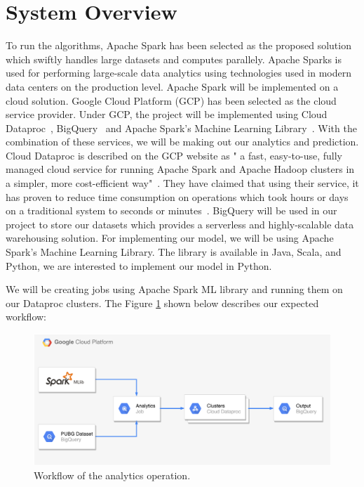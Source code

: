\documentclass[journal,twoside,web]{ieeecolor}
\begin{document}
\section{System Overview}
\label{sec:system_overivew}
To run the algorithms, Apache Spark has been selected as the proposed solution which swiftly handles large datasets and computes parallely. Apache Sparks is used for performing large-scale data analytics using technologies used in modern data centers on the production level. Apache Spark will be implemented on a cloud solution. Google Cloud Platform (GCP) has been selected as the cloud service provider. Under GCP, the project will be implemented using Cloud Dataproc~\cite{noauthor_dataproc_nodate}, BigQuery~\cite{noauthor_bigquery_nodate} and Apache Spark's Machine Learning Library~\cite{noauthor_mllib_nodate}. With the combination of these services, we will be making out our analytics and prediction. Cloud Dataproc is described on the GCP website as " a fast, easy-to-use, fully managed cloud service for running Apache Spark and Apache Hadoop clusters in a simpler, more cost-efficient way"~\cite{noauthor_dataproc_nodate}. They have claimed that using their service, it has proven to reduce time consumption on operations which took hours or days on a traditional system to seconds or minutes~\cite{noauthor_dataproc_nodate}. BigQuery will be used in our project to store our datasets which provides a serverless and highly-scalable data warehousing solution. For implementing our model, we will be using Apache Spark's Machine Learning Library. The library is available in Java, Scala, and Python, we are interested to implement our model in Python. 

We will be creating jobs using Apache Spark ML library and running them on our Dataproc clusters. The Figure \ref{fig:1} shown below describes our expected workflow:

\begin{figure}[]
  \includegraphics[width=\textwidth]{images/flow.pdf}
  \caption{Workflow of the analytics operation.}
  \label{fig:1}
\end{figure}
\end{document}
